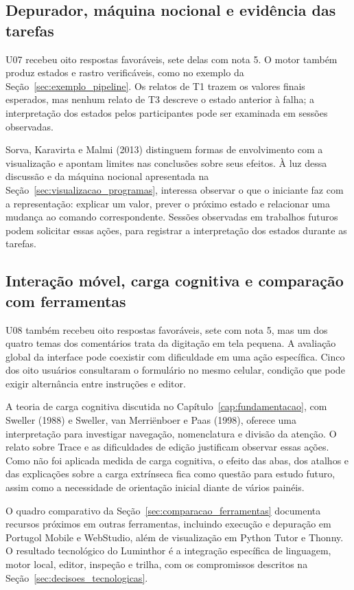 \subsection{Depurador, máquina nocional e evidência das tarefas}

U07 recebeu oito respostas favoráveis, sete delas com nota 5. O motor também
produz estados e rastro verificáveis, como no exemplo da
Seção~\ref{sec:exemplo_pipeline}. Os relatos de T1 trazem os valores finais esperados, mas nenhum relato de T3 descreve o estado anterior à falha; a interpretação dos estados pelos participantes pode ser examinada em sessões observadas.

Sorva, Karavirta e Malmi (2013) distinguem formas de envolvimento com a visualização
e apontam limites nas conclusões sobre seus efeitos. À luz dessa discussão e da
máquina nocional apresentada na Seção~\ref{sec:visualizacao_programas}, interessa
observar o que o iniciante faz com a representação: explicar um valor, prever o
próximo estado e relacionar uma mudança ao comando correspondente. Sessões observadas em trabalhos futuros podem solicitar essas ações, para
registrar a interpretação dos estados durante as tarefas.

\subsection{Interação móvel, carga cognitiva e comparação com ferramentas}

U08 também recebeu oito respostas favoráveis, sete com nota 5, mas um dos quatro
temas dos comentários trata da digitação em tela pequena. A avaliação global da
interface pode coexistir com dificuldade em uma ação específica. Cinco dos oito
usuários consultaram o formulário no mesmo celular, condição que pode exigir
alternância entre instruções e editor.

A teoria de carga cognitiva discutida no Capítulo~\ref{cap:fundamentacao}, com
Sweller (1988) e Sweller, van Merriënboer e Paas (1998), oferece uma interpretação
para investigar navegação, nomenclatura e divisão da atenção. O relato sobre
Trace e as dificuldades de edição justificam observar essas ações. Como não foi aplicada medida de carga cognitiva, o efeito das abas, dos atalhos e das explicações sobre a carga extrínseca fica como questão para estudo futuro, assim como a necessidade de orientação inicial diante de vários painéis.

O quadro comparativo da Seção~\ref{sec:comparacao_ferramentas} documenta recursos
próximos em outras ferramentas, incluindo execução e depuração em Portugol Mobile
e WebStudio, além de visualização em Python Tutor e Thonny. O resultado tecnológico do Luminthor é a integração específica de linguagem, motor local, editor, inspeção
e trilha, com os compromissos descritos na Seção~\ref{sec:decisoes_tecnologicas}.



